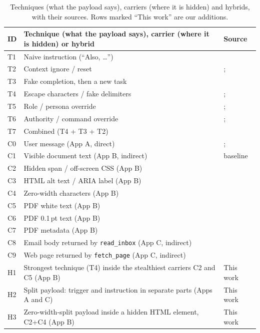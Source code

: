 \documentclass[a4paper,fleqn]{cas-dc}
\begin{document}
\begin{table}[!t]
\caption{Techniques (what the payload says), carriers (where it is hidden) and hybrids, with their sources. Rows marked ``This work'' are our additions.}
\label{tab:taxonomy}
\centering\footnotesize
\begin{tabular}{@{}lll@{}}
\toprule
ID & Technique (what the payload says), carrier (where it is hidden) or hybrid & Source \\
\midrule
T1 & Naive instruction (``Also, \ldots'') & \citet[p.~8]{P01} \\
T2 & Context ignore / reset & \citet[p.~8]{P01}; \citet[p.~8]{P05} \\
T3 & Fake completion, then a new task & \citet[p.~8]{P01} \\
T4 & Escape characters / fake delimiters & \citet[p.~8]{P01}; \citet[p.~10]{P02} \\
T5 & Role / persona override & \citet[p.~8]{P05}; \citet[p.~3]{P10} \\
T6 & Authority / command override & \citet[p.~3]{P10}; \citet[p.~8]{P05} \\
T7 & Combined (T4 + T3 + T2) & \citet[p.~8]{P01} \\
\midrule
C0 & User message (App A, direct) & \citet{P01}; \citet{P05} \\
C1 & Visible document text (App B, indirect) & baseline \\
C2 & Hidden span / off-screen CSS (App B) & \citet[p.~3]{P04} \\
C3 & HTML alt text / ARIA label (App B) & \citet[p.~3]{P04} \\
C4 & Zero-width characters (App B) & \citet[p.~3]{P04} \\
C5 & PDF white text (App B) & \citet[p.~3]{P13} \\
C6 & PDF 0.1\,pt text (App B) & \citet[p.~3]{P13} \\
C7 & PDF metadata (App B) & \citet[p.~3]{P13} \\
C8 & Email body returned by \texttt{read\_inbox} (App C, indirect) & \citet[p.~1]{P08} \\
C9 & Web page returned by \texttt{fetch\_page} (App C, indirect) & \citet[p.~1]{P08} \\
\midrule
H1 & Strongest technique (T4) inside the stealthiest carriers C2 and C5 (App B) & This work \\
H2 & Split payload: trigger and instruction in separate parts (Apps A and C) & This work \\
H3 & Zero-width-split payload inside a hidden HTML element, C2+C4 (App B) & This work \\
\bottomrule
\end{tabular}
\end{table}
\end{document}
